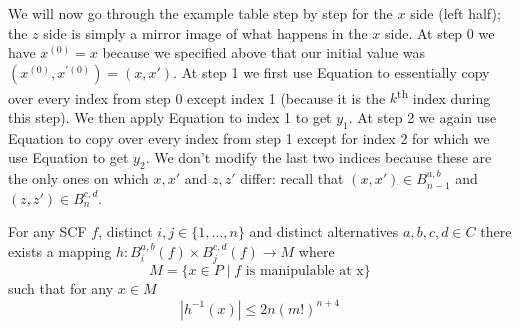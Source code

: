 	We will now go through the example table step by step for the $x$ side (left half); the $z$ side is simply a mirror image of what happens in the $x$ side. At step 0 we have $x^{(0)} = x$ because we specified above that our initial value was $(x^{(0)}, x^{\prime(0)}) = (x,x')$. At step 1 we first use Equation to essentially copy over every index from step 0 except index 1 (because it is the $k$\textsuperscript{th} index during this step). We then apply Equation to index 1 to get $y_1$. At step 2 we again use Equation to copy over every index from step 1 except for index 2 for which we use Equation to get $y_2$. We don't modify the last two indices because these are the only ones on which $x, x'$ and $z, z'$ differ: recall that $(x, x') \in B_{n-1}^{a,b}$ and $(z, z') \in B_{n}^{c,d}$.

	\begin{lemma}
		For any SCF $f$, distinct $i, j \in \{1, \ldots, n\}$ and distinct alternatives $a, b, c, d \in C$ there exists a mapping $h : B_i^{a,b}(f) \times B_j^{c,d}(f) \rightarrow M$ where
		\[
			M = \{x \in P \mid f \text{ is manipulable at x}\}
		\]
		such that for any $x \in M$
		\[
			|h^{-1}(x)| \le 2n(m!)^{n+4}
		\]
	\end{lemma}
